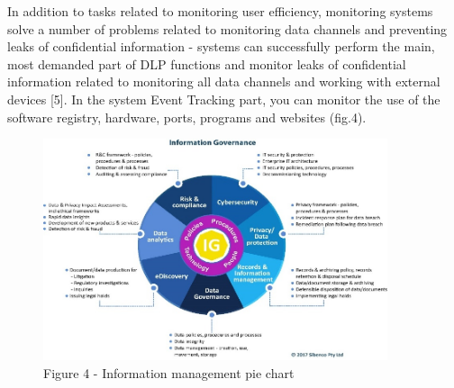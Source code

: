 \begin{multicols}{2}
In addition to tasks related to monitoring user efficiency, monitoring
systems solve a number of problems related to monitoring data channels
and preventing leaks of confidential information - systems can
successfully perform the main, most demanded part of DLP functions and
monitor leaks of confidential information related to monitoring all data
channels and working with external devices {[}5{]}. In the system Event
Tracking part, you can monitor the use of the software registry,
hardware, ports, programs and websites (fig.4).
\end{multicols}

\begin{figure}[H]
	\centering
	\includegraphics[width=0.9\textwidth]{assets/66}
	\caption*{Figure 4 - Information management pie chart}
\end{figure}

